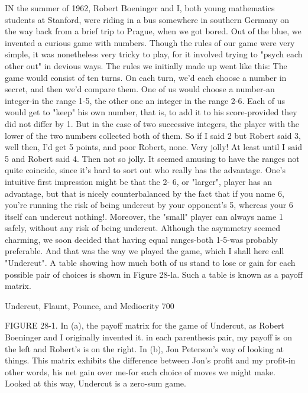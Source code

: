 IN the summer of 1962, Robert Boeninger and I, both young mathematics students
at Stanford, were riding in a bus somewhere in southern Germany on the way back
from a brief trip to Prague, when we got bored. Out of the blue, we invented a curious
game with numbers. Though the rules of our game were very simple, it was
nonetheless very tricky to play, for it involved trying to "psych each other out" in
devious ways. The rules we initially made up went like this: The game would consist
of ten turns. On each turn, we'd each choose a number in secret, and then we'd
compare them. One of us would choose a number-an integer-in the range 1-5, the
other one an integer in the range 2-6. Each of us would get to "keep" his own number,
that is, to add it to his score-provided they did not differ by 1. But in the case of two
successive integers, the player with the lower of the two numbers collected both of
them. So if I said 2 but Robert said 3, well then, I'd get 5 points, and poor Robert,
none. Very jolly! At least until I said 5 and Robert said 4. Then not so jolly.
         It seemed amusing to have the ranges not quite coincide, since it's hard to sort
out who really has the advantage. One's intuitive first impression might be that the 2-
6, or "larger", player has an advantage, but that is nicely counterbalanced by the fact
that if you name 6, you're running the risk of being undercut by your opponent's 5,
whereas your 6 itself can undercut nothing!. Moreover, the "small" player can always
name 1 safely, without any risk of being undercut.
         Although the asymmetry seemed charming, we soon decided that having equal
ranges-both 1-5-was probably preferable. And that was the way we played the game,
which I shall here call "Undercut". A table showing how much both of us stand to
lose or gain for each possible pair of choices is shown in Figure 28-la. Such a table is
known as a payoff matrix.




Undercut, Flaunt, Pounce, and Mediocrity                                             700

FIGURE 28-1. In (a), the payoff matrix for the game of Undercut, as Robert
Boeninger and I originally invented it. in each parenthesis pair, my payoff is on the
left and Robert's is on the right. In (b), Jon Peterson's way of looking at things. This
matrix exhibits the difference between Jon's profit and my profit-in other words, his
net gain over me-for each choice of moves we might make. Looked at this way,
Undercut is a zero-sum game.

